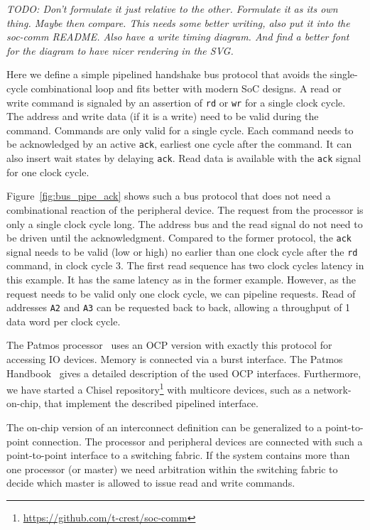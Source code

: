 \documentclass[%
    10pt,
    headinclude, footexclude,
    openright, %
    notitlepage,
    cleardoubleempty,
    headsepline,
    pointlessnumbers,
    bibtotoc, idxtotoc,
    ]{scrbook}
\newcommand{\code}[1]{{\small{\texttt{#1}}}}
\newcommand{\todo}[1]{{\emph{TODO: #1}}}
\newcommand{\myref}[2]{\href{#1}{#2}}
\renewcommand{\myref}[2]{{#2}{\footnote{\url{#1}}}}
\begin{document}
\todo{Don't formulate it just relative to the other. Formulate it as its own thing.
Maybe then compare. This needs some better writing, also put it into the soc-comm README.
Also have a write timing diagram. And find a better font for the diagram to have nicer
rendering in the SVG.}

Here we define a simple pipelined handshake bus protocol that avoids the single-cycle combinational loop and fits better with modern SoC designs.
 A read or write command is signaled by an assertion of \code{rd} or \code{wr}
 for a single clock cycle.
The address and write data (if it is a write) need to be valid during
the command. Commands are only valid for a single cycle.
Each command needs to be acknowledged by an active \code{ack},
earliest one cycle after the command. It can also insert wait
states by delaying \code{ack}. Read data is available with the \code{ack}
signal for one clock cycle.

Figure~\ref{fig:bus_pipe_ack} shows such a bus protocol that does not need
a combinational reaction of the peripheral device. The request from the processor
is only a single clock cycle long. The address bus and the read signal do not need to be driven
until the acknowledgment. Compared to the former protocol, the \code{ack} signal needs to
be valid (low or high)
no earlier than one clock cycle after the \code{rd} command, in clock cycle 3.
The first read sequence has two clock cycles latency in this example.
It has the same latency as in the former example.
However, as the request needs to be valid only one clock cycle, we can pipeline
requests. Read of addresses \code{A2} and \code{A3} can be requested back to back,
allowing a throughput of 1 data word per clock cycle.

The Patmos processor~\cite{patmos:rts2018} uses an OCP version with exactly this
protocol for accessing IO devices. Memory is connected via a burst interface.
The Patmos Handbook~\cite{patmos:handbook} gives a detailed description of the
used OCP interfaces.
Furthermore, we have started a
\myref{https://github.com/t-crest/soc-comm}{Chisel repository} with multicore devices, such as
a network-on-chip, that implement the described pipelined interface.

The on-chip version of an interconnect definition can be generalized to a point-to-point
connection. The processor and peripheral devices are connected with such a point-to-point
interface to a switching fabric. If the system contains more than one processor (or master)
we need arbitration within the switching fabric to decide which master is allowed to issue
read and write commands.
\end{document}
